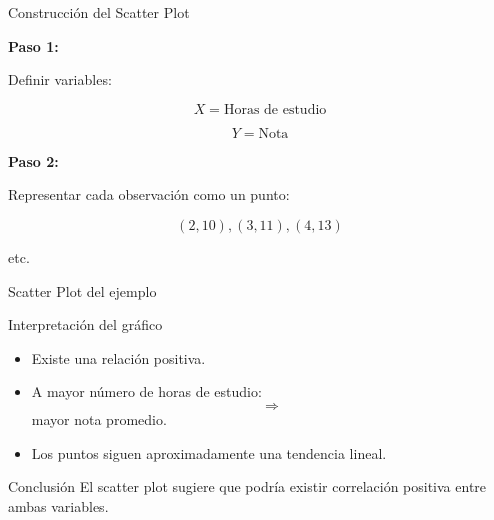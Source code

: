 \documentclass{beamer}
\begin{document}
\begin{frame}{Construcción del Scatter Plot}

\textbf{Paso 1:}

Definir variables:

\[
X = \text{Horas de estudio}
\]

\[
Y = \text{Nota}
\]

\vspace{0.4cm}

\textbf{Paso 2:}

Representar cada observación como un punto:

\[
(2,10), (3,11), (4,13)
\]

etc.

\end{frame}

\begin{frame}{Scatter Plot del ejemplo}

\begin{center}


\end{center}

\end{frame}

\begin{frame}{Interpretación del gráfico}

\begin{itemize}
\item Existe una relación positiva.
\item A mayor número de horas de estudio:
\[
\Rightarrow
\]
mayor nota promedio.
\item Los puntos siguen aproximadamente una tendencia lineal.
\end{itemize}

\vspace{0.4cm}

\begin{block}{Conclusión}
El scatter plot sugiere que podría existir correlación positiva entre ambas variables.
\end{block}

\end{frame}
\end{document}
